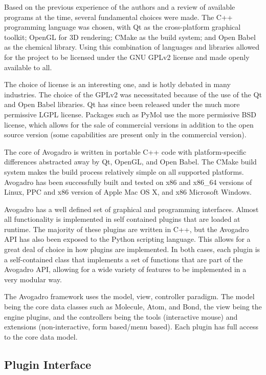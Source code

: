\documentclass[10pt]{bmc_article}
\newenvironment{bmcformat}{\begin{raggedright}
\baselineskip20pt\sloppy\setboolean{publ}{false}}{\end{raggedright}
\baselineskip20pt\sloppy}
\begin{document}
\begin{bmcformat}
Based on the previous experience of the authors and a review of available
programs at the time, several fundamental choices were made. The C++ programming
language was chosen, with Qt as the cross-platform graphical toolkit; OpenGL for
3D rendering; CMake as the build system; and Open Babel as the chemical library.
Using this combination of languages and libraries allowed for the project to be
licensed under the GNU GPLv2 license and made openly available to all.

The choice of license is an interesting one, and is hotly debated in many
industries. The choice of the GPLv2 was necessitated because of the use of the
Qt and Open Babel libraries. Qt has since been released under the much more
permissive LGPL license. Packages such as PyMol use the more permissive BSD
license, which allows for the sale of commercial versions in addition to the open
source version (some capabilities are present only in the commercial version).

The core of Avogadro is written in portable C++ code with platform-specific
differences abstracted away by Qt, OpenGL, and Open Babel. The CMake build system
makes the build process relatively simple on all supported platforms. Avogadro
has been successfully built and tested on x86 and x86\_64 versions of Linux, PPC
and x86 version of Apple Mac OS X, and x86 Microsoft Windows.

Avogadro has a well defined set of graphical and programming interfaces. Almost
all functionality is implemented in self contained plugins that are loaded at
runtime. The majority of these plugins are written in C++, but the Avogadro API
has also been exposed to the Python scripting language. This allows for a great
deal of choice in how plugins are implemented. In both cases, each plugin is a
self-contained class that implements a set of functions that are part of the
Avogadro API, allowing for a wide variety of features to be implemented in a
very modular way.

The Avogadro framework uses the model, view, controller paradigm. The model
being the core data classes such as Molecule, Atom, and Bond, the view being the
engine plugins, and the controllers being the tools (interactive mouse) and
extensions (non-interactive, form based/menu based). Each plugin has full access
to the core data model.

\subsection{Plugin Interface}


\end{bmcformat}
\end{document}
